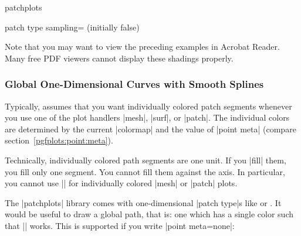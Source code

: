 {\begin{pgfplotslibrary}{patchplots}
\begin{pgfplotskey}{patch type sampling= (initially false)}
\begin{codeexample}[]
\end{codeexample}
    Note that you may want to view the preceding examples in Acrobat Reader.
    Many free PDF viewers cannot display these shadings properly.
\end{pgfplotskey}


\subsubsection{Global One-Dimensional Curves with Smooth Splines}

Typically, \PGFPlots{} assumes that you want individually colored patch
segments whenever you use one of the plot handlers  |mesh|, |surf|, or |patch|.
The individual colors are determined by the current |colormap| and the value of
|point meta| (compare section~\ref{pgfplots:point:meta}).

Technically, individually colored path segments are one unit. If you |fill|
them, you fill only one segment. You cannot fill them against the axis. In
particular, you cannot use |\closedcycle| for individually colored |mesh| or
|patch| plots.

The |patchplots| library comes with one-dimensional |patch type|s like
 or . It would be useful
to draw a global path, that is: one which has a single color such that
|\closedcycle| works. This is supported if you write |point meta=none|:
%
\begin{codeexample}[]
\end{codeexample}
\end{pgfplotslibrary}}

